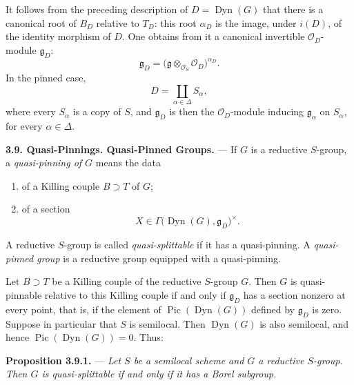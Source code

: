 It follows from the preceding description of
\(D=\operatorname{Dyn}(G)\) that there is a canonical root of \(B_D\)
relative to \(T_D\): this root \(\alpha_D\) is the image, under
\(i(D)\), of the identity morphism of \(D\). One obtains from it a
canonical invertible \(\mathcal O_D\)-module \(\mathfrak g_D\):
\[
  \mathfrak g_D
  =
  \bigl(\mathfrak g\otimes_{\mathcal O_S}\mathcal O_D\bigr)^{\alpha_D}.
\]
In the pinned case,
\[
  D=\coprod_{\alpha\in\Delta}S_\alpha,
\]
where every \(S_\alpha\) is a copy of \(S\), and
\(\mathfrak g_D\) is then the \(\mathcal O_D\)-module inducing
\(\mathfrak g_\alpha\) on \(S_\alpha\), for every
\(\alpha\in\Delta\).

\medskip\noindent\textbf{3.9. Quasi-Pinnings. Quasi-Pinned Groups.} ---
If \(G\) is a reductive \(S\)-group, a \emph{quasi-pinning of \(G\)}
means the data
\begin{enumerate}
\item[(i)] of a Killing couple \(B\supset T\) of \(G\);
\item[(ii)] of a section
\[
  X\in\Gamma\bigl(\operatorname{Dyn}(G),\mathfrak g_D\bigr)^\times.
\]
\end{enumerate}
A reductive \(S\)-group is called \emph{quasi-splittable} if it has a
quasi-pinning. A \emph{quasi-pinned group} is a reductive group
equipped with a quasi-pinning.

Let \(B\supset T\) be a Killing couple of the reductive \(S\)-group
\(G\). Then \(G\) is quasi-pinnable relative to this Killing couple
if and only if \(\mathfrak g_D\) has a section nonzero at every point,
that is, if the element of \(\operatorname{Pic}(\operatorname{Dyn}(G))\)
defined by \(\mathfrak g_D\) is zero. Suppose in particular that
\(S\) is semilocal. Then \(\operatorname{Dyn}(G)\) is also semilocal,
and hence \(\operatorname{Pic}(\operatorname{Dyn}(G))=0\). Thus:

\medskip\noindent\textbf{Proposition 3.9.1.} ---
{\itshape Let \(S\) be a semilocal scheme and \(G\) a reductive
\(S\)-group. Then \(G\) is quasi-splittable if and only if it has a
Borel subgroup.}




